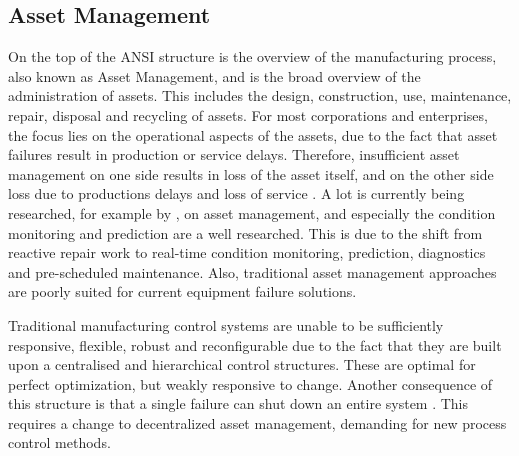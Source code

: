	 


\subsection{Asset Management}
On the top of the ANSI structure is the overview of the manufacturing process, also known as Asset Management, and is the broad overview of the administration of assets. This includes the design, construction, use, maintenance, repair, disposal and recycling of assets. For most corporations and enterprises, the focus lies on the operational aspects of the assets, due to the fact that asset failures result in production or service delays. Therefore, insufficient asset management on one side results in loss of the asset itself, and on the other side loss due to productions delays and loss of service \citep{trappey2013multi}.  A lot is currently being researched, for example by \citet{leitao2009agent}, on asset management, and especially the condition monitoring and prediction are a well researched. This is due to the shift from reactive repair work to real-time condition monitoring, prediction, diagnostics and pre-scheduled maintenance. Also, traditional asset management approaches are poorly suited for current equipment failure solutions. %
	
Traditional manufacturing control systems are unable to be sufficiently responsive, flexible, robust and reconfigurable due to the fact that they are built upon a centralised and hierarchical control structures. These are optimal for perfect optimization, but weakly responsive to change. Another consequence of this structure is that a single failure can shut down an entire system \citep{leitao2009agent}. This requires a change to decentralized asset management, demanding for new process control methods.
	
	
